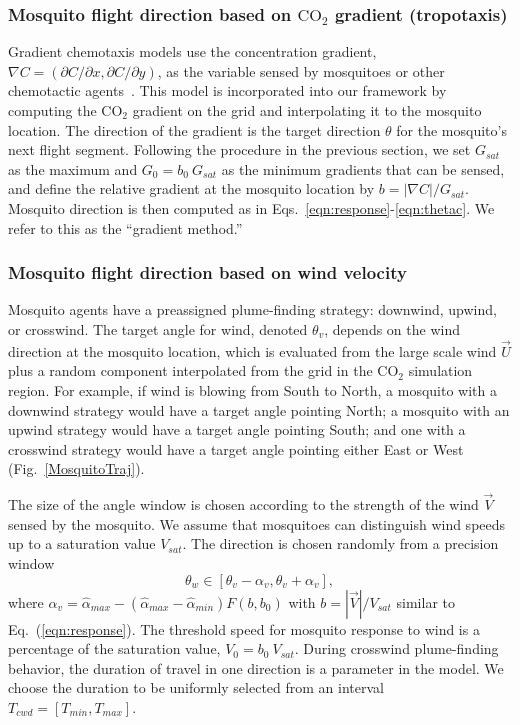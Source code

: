 \documentclass[10pt]{article}
\begin{document}
\subsubsection*{Mosquito flight direction based on $\mbox{CO}_2$ gradient (tropotaxis)}
Gradient chemotaxis models use the concentration gradient, $\nabla C = (\partial C /\partial x,\partial C /\partial y )$, as the variable sensed by 
mosquitoes or other chemotactic agents~\cite{KellerSegel,Horstmann}.  This model is incorporated into our framework 
by computing the $\mbox{CO}_2$ gradient on the grid and
interpolating it to
the mosquito location.  The direction of the gradient
is the target direction $\theta$ for the mosquito's next flight
segment. 
Following the procedure in the previous section, we set $G_{sat}$ as the maximum 
 and $G_0 = b_0\ G_{sat}$ as the minimum gradients that can be sensed, and define the relative gradient at  the mosquito
location by $b = |\nabla C|/G_{sat}$.  
Mosquito direction is then computed as in Eqs.~\eqref{eqn:response}-\eqref{eqn:thetac}.  We refer to this as the ``gradient method.''

\subsubsection*{Mosquito flight direction based on wind velocity}
Mosquito agents have a preassigned plume-finding strategy: downwind, upwind, or crosswind.
The target angle for wind, denoted $\theta_v$, depends on the wind direction at the mosquito location, which is
evaluated from the large scale wind $\vec{U}$ plus a random component
interpolated from the grid in the $\mbox{CO}_2$ simulation region.  
For example, if wind is blowing from South to North, a mosquito with a downwind strategy would have a target angle pointing North; a mosquito with an upwind strategy would have a target angle pointing South; and one with
a crosswind strategy would have a target angle pointing either East or West (Fig.~\ref{MosquitoTraj}).

The size of the angle window is chosen according to the strength of the wind $\vec V$ sensed by the mosquito.  
We assume that mosquitoes can distinguish wind speeds up to a saturation value $V_{sat}$.  The direction is chosen randomly from a precision window
\begin{equation}
	 \theta_w \in [\theta_v-\alpha_v,\theta_v+\alpha_v], \label{eqn:thetav}
\end{equation}
where $\alpha_v = \hat{\alpha}_{max} - (\hat{\alpha}_{max}-\hat{\alpha}_{min}) F(b,b_0)$ with $b = |\vec{V}|/V_{sat}$ similar to Eq.~(\ref{eqn:response}). The threshold speed for mosquito response to wind is a percentage of the saturation value, $V_0 = b_0\ V_{sat}$.
During crosswind plume-finding behavior, the duration of travel in one direction is a parameter in
the model. We choose the duration to be uniformly selected
from an interval $T_{cwd} = [T_{min},T_{max}]$.
\end{document}
